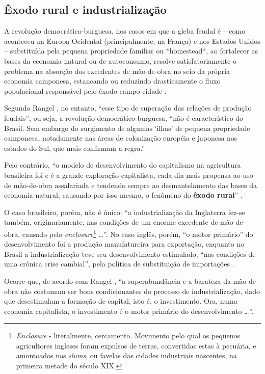 \documentclass[
	12pt,				%
	oneside,			%
	a4paper,			%
	chapter=TITLE,		%
	section=TITLE,		%
	english,			%
	brazil				%
	]{abntex2}
\begin{document}
\hypertarget{uxeaxodo-rural-e-industrializauxe7uxe3o}{%
\subsection{Êxodo rural e industrialização}\label{uxeaxodo-rural-e-industrializauxe7uxe3o}}
\begin{citacao}
A revolução democrático-burguesa, nos casos em que a gleba feudal é -- como
aconteceu na Europa Ocidental (principalmente, na França) e nos Estados Unidos
-- substituída pela pequena propriedade familiar ou *homestead*, ao fortalecer
as bases da economia natural ou de autoconsumo, resolve satisfatoriamente o
problema na absorção dos excedentes de mão-de-obra no seio da própria economia
camponesa, estancando ou reduzindo drasticamente o fluxo populacional
responsável pelo êxodo campo-cidade \cite[p.~133]{rangel1986b}. 
\end{citacao}
Segundo Rangel \autocite*[133]{rangel1986b}, no entanto, ``esse tipo de superação das
relações de produção feudais'', ou seja, a revolução democrático-burguesa, ``não é
característico do Brasil. Sem embargo do surgimento de algumas `ilhas' de
pequena propriedade camponesa, notadamente nas áreas de colonização européia e
japonesa nos estados do Sul, que mais confirmam a regra.''

Pelo contrário, ``o modelo de desenvolvimento do capitalismo na agricultura
brasileira foi e é a grande exploração capitalista, cada dia mais propensa ao
uso de mão-de-obra assalariada e tendendo sempre ao desmantelamento das bases da
economia natural, causando por isso mesmo, o fenômeno do \textbf{êxodo rural}''
\autocite[134, grifo nosso]{rangel1986b}.

O caso brasileiro, porém, não é único: ``a industrialização da Inglaterra fez-se
também, originariamente, nas condições de um enorme excedente de mão de obra,
causado pelo \emph{enclosure}\footnote{\emph{Enclosure} - literalmente, cercamento. Movimento pelo qual os pequenos
  agricultores ingleses foram expulsos de terras, convertidas estas à pecuária, e
  amontoados nos \emph{slums}, ou favelas das cidades industriais nascentes, na
  primeira metade do século XIX.} \ldots{}''. No caso inglês, porém, ``o motor primário'' do
desenvolvimento foi a produção manufatureira para exportação, enquanto no Brasil
a industrialização teve seu desenvolvimento estimulado, ``nas condições de uma
crônica crise cambial'', pela política de substituição de importações
\autocite[43-44]{rangel1962}.

Ocorre que, de acordo com Rangel \autocite*[134]{rangel1986b}, ``a superabundância e a
barateza da mão-de-obra não costumam ser bons condicionantes do processo de
industrialização, dado que desestimulam a formação de capital, isto é, o
investimento. Ora, numa economia capitalista, o investimento é o motor primário
do desenvolvimento \ldots{}''.
\end{document}
